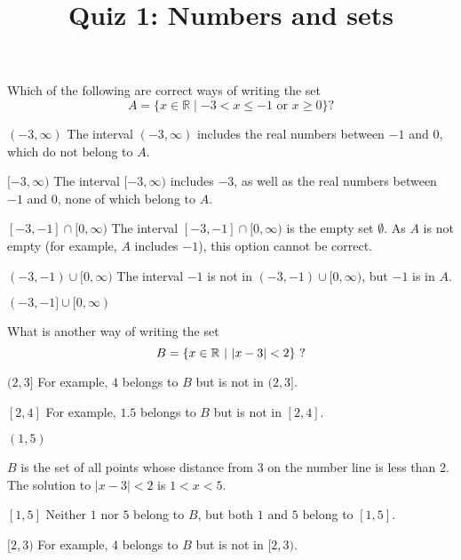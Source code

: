 \documentclass[pst2pdf]{webquiz}
\title{Quiz 1: Numbers and sets}
\begin{document}
        \begin{question}
        Which of the following are correct ways of writing the set
        \[ A=\{x \in \mathbb{R} \mid -3 < x \leq -1 \text{ or } x\geq 0\} ?\]
        \begin{choice}
        \incorrect $(-3,\infty)$
        \response The interval $(-3,\infty)$ includes the real numbers between $-1$ and $0$,
        which do not belong to $A$.

        \incorrect $[-3,\infty)$
        \response The interval $[-3,\infty)$ includes $-3$, as well as
        the real numbers between $-1$ and $0$, none of which
         belong to $A$.

        \incorrect $[-3,-1]\cap[0,\infty)$
        \response The interval $[-3,-1]\cap[0,\infty)$ is the empty set $\emptyset$. As $A$ is not empty (for example, $A$ includes $-1$), this option cannot be correct.

        \incorrect $(-3,-1)\cup[0,\infty)$
        \response The interval $-1$ is not in $(-3,-1)\cup[0,\infty)$, but $-1$ is in $A$.

        \correct $(-3,-1]\cup[0,\infty)$

        \end{choice}
\end{question}

\begin{question}
What is another way of writing the set
\[B= \{x \in {\mathbb R}\ |\ |x-3|<2 \}\ \rm{?}\]
\begin{choice}
\incorrect $(2,3]$
\response For example, $4$ belongs to $B$ but is not in $(2,3]$.

\incorrect $[2,4]$
\response For example, $1.5$ belongs to $B$ but is not in $[2,4]$.

\correct $(1,5)$

\response $B$ is the set of all points whose distance from 3 on the
number line is less than 2. \\
The solution to $|x-3|<2$ is $1<x<5$.

\incorrect $[1,5]$
\response Neither $1$ nor $5$  belong to $B$, but both $1$ and $5$ belong to $[1,5]$.

\incorrect $[2,3)$
\response For example, $4$ belongs to $B$ but is not in $[2,3)$.

\end{choice}
\end{question}
\end{document}
